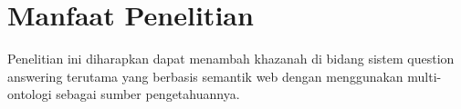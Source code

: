 \section{Manfaat Penelitian}
Penelitian ini diharapkan dapat menambah khazanah di bidang sistem question answering terutama yang berbasis semantik web dengan menggunakan multi-ontologi sebagai sumber pengetahuannya.